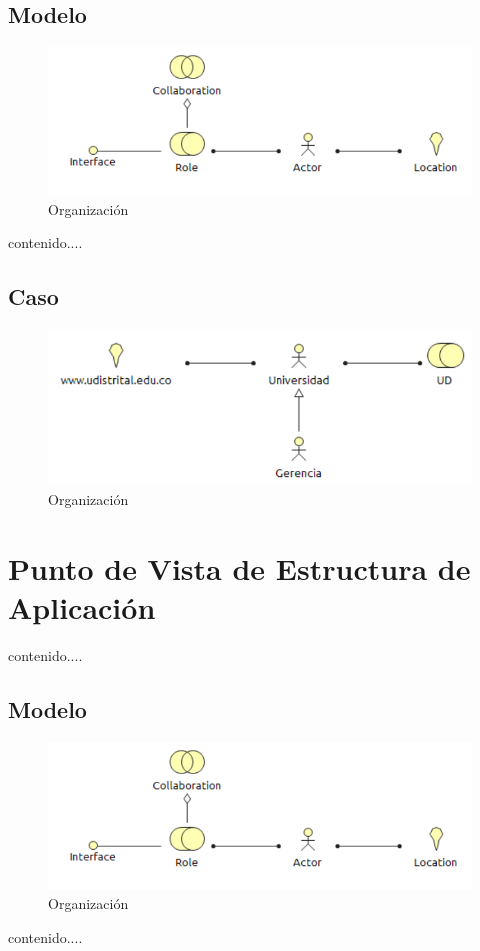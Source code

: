 \subsection{Modelo}
\begin{figure}[th!]
	\centering
	\includegraphics[width=0.8\linewidth]{arquitectura_diseno/imgs/M_Organizacion}
	\caption{Organización}
\end{figure}
\newpage
contenido....
\subsection{Caso}
\begin{figure}[th!]
	\centering
	\includegraphics[width=0.8\linewidth]{arquitectura_diseno/imgs/C_Organizacion}
	\caption{Organización}
\end{figure}
\newpage
\section{Punto de Vista de Estructura de Aplicación}
contenido....
\subsection{Modelo}
\begin{figure}[th!]
	\centering
	\includegraphics[width=0.8\linewidth]{arquitectura_diseno/imgs/M_Organizacion}
	\caption{Organización}
\end{figure}
\newpage
contenido....
